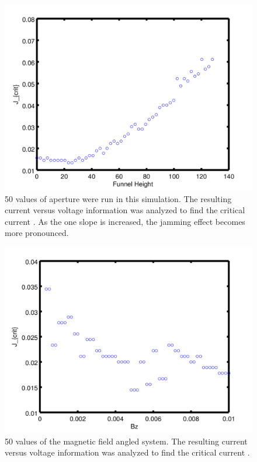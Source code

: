 \begin{figure}[htbp]
\begin{center}
\includegraphics[scale=.50]{oneSideY.png}
\caption{ 50 values of aperture were run in this simulation. The resulting current versus voltage information was analyzed to find the critical current . As the one slope is increased, the jamming effect becomes more pronounced. }
\label{normalYscan}
\end{center}
\end{figure}


\begin{figure}[htbp]
\begin{center}
\includegraphics[scale=.50]{2DAngleBz.png}
\caption{ 50 values of the magnetic field angled system. The resulting current versus voltage information was analyzed to find the critical current .  }
\label{angleBz}
\end{center}
\end{figure}


